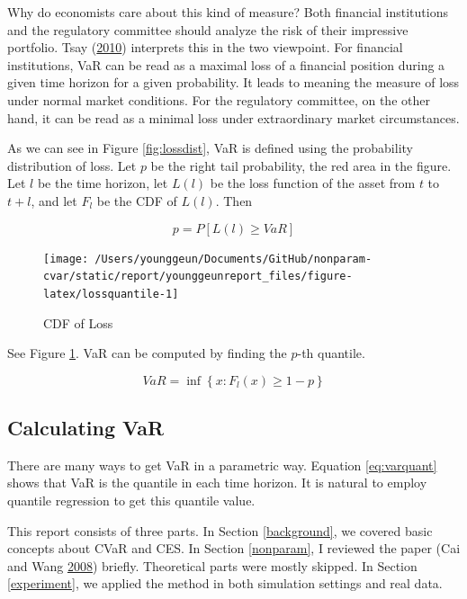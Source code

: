 \documentclass[
]{article}
\theoremstyle{definition}
\theoremstyle{definition}
\theoremstyle{definition}
\theoremstyle{remark}
\begin{document}
Why do economists care about this kind of measure? Both financial institutions and the regulatory committee should analyze the risk of their impressive portfolio. Tsay (\protect\hyperlink{ref-Tsay:2010aa}{2010}) interprets this in the two viewpoint. For financial institutions, VaR can be read as a maximal loss of a financial position during a given time horizon for a given probability. It leads to meaning the measure of loss under normal market conditions. For the regulatory committee, on the other hand, it can be read as a minimal loss under extraordinary market circumstances.

As we can see in Figure \ref{fig:lossdist}, VaR is defined using the probability distribution of loss. Let \(p\) be the right tail probability, the red area in the figure. Let \(l\) be the time horizon, let \(L(l)\) be the loss function of the asset from \(t\) to \(t + l\), and let \(F_l\) be the CDF of \(L(l)\). Then

\begin{equation}
  p = P \left[ L(l) \ge VaR \right]
  \label{eq:vardef}
\end{equation}

\begin{figure}[H]

{\centering \texttt{[image: /Users/younggeun/Documents/GitHub/nonparam-cvar/static/report/younggeunreport\_files/figure-latex/lossquantile-1]} 

}

\caption{CDF of Loss}\label{fig:lossquantile}
\end{figure}

See Figure \ref{fig:lossquantile}. VaR can be computed by finding the \(p\)-th quantile.

\begin{equation}
  VaR = \inf \left\{ x \mathpunct{:} F_l(x) \ge 1 - p \right\}
  \label{eq:varquant}
\end{equation}

\hypertarget{calculating-var}{%
\subsection{Calculating VaR}\label{calculating-var}}

There are many ways to get VaR in a parametric way. Equation \eqref{eq:varquant} shows that VaR is the quantile in each time horizon. It is natural to employ quantile regression to get this quantile value.

This report consists of three parts. In Section \ref{background}, we covered basic concepts about CVaR and CES. In Section \ref{nonparam}, I reviewed the paper (Cai and Wang \protect\hyperlink{ref-cai:2008aa}{2008}) briefly. Theoretical parts were mostly skipped. In Section \ref{experiment}, we applied the method in both simulation settings and real data.
\end{document}
